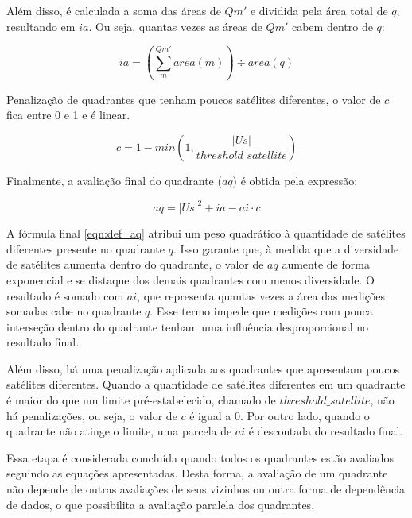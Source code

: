 \documentclass[cic,tc]{iiufrgs}
\begin{document}
Além disso, é calculada a soma das áreas de $Qm'$ e dividida pela área total de $q$, resultando em $ia$. Ou seja, quantas vezes as áreas de $Qm'$ cabem dentro de $q$: \par

\begin{equation} \label{eqn:def_ia}
ia = \left(\sum_{m}^{Qm'} area\left(m\right)\right) \div area(q)
\end{equation}

Penalização de quadrantes que tenham poucos satélites diferentes, o valor de $c$ fica entre 0 e 1 e é linear. \par

\begin{equation} \label{eqn:def_c}
c = 1 - min\left(1, \frac{|Us|}{threshold\_satellite}\right)
\end{equation}

Finalmente, a avaliação final do quadrante ($aq$) é obtida pela expressão: \par

\begin{equation} \label{eqn:def_aq}
aq = |Us|^2 + ia - ai \cdot c
\end{equation}

A fórmula final \ref{eqn:def_aq} atribui um peso quadrático à quantidade de satélites diferentes presente no quadrante $q$. Isso garante que, à medida que a diversidade de satélites aumenta dentro do quadrante, o valor de $aq$ aumente de forma exponencial e se distaque dos demais quadrantes com menos diversidade. O resultado é somado com $ai$, que representa quantas vezes a área das medições somadas cabe no quadrante $q$. Esse termo impede que medições com pouca interseção dentro do quadrante tenham uma influência desproporcional no resultado final. \par

Além disso, há uma penalização aplicada aos quadrantes que apresentam poucos satélites diferentes. Quando a quantidade de satélites diferentes em um quadrante é maior do que um limite pré-estabelecido, chamado de $threshold\_satellite$, não há penalizações, ou seja, o valor de $c$ é igual a 0. Por outro lado, quando o quadrante não atinge o limite, uma parcela de $ai$ é descontada do resultado final. \par

Essa etapa é considerada concluída quando todos os quadrantes estão avaliados seguindo as equações apresentadas. Desta forma, a avaliação de um quadrante não depende de outras avaliações de seus vizinhos ou outra forma de dependência de dados, o que possibilita a avaliação paralela dos quadrantes. \par
\end{document}
